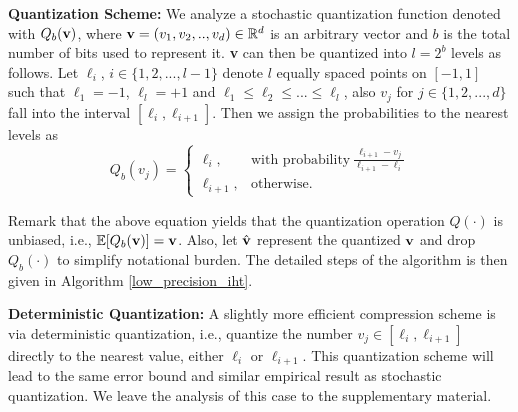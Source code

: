 \documentclass{article}
\begin{document}
{\bf Quantization Scheme:} We analyze a stochastic quantization function denoted with $Q_b({\bf v})$, where ${\bf v}=(v_1, v_2, .., v_d) \in \mathbb{R}^d$ is an arbitrary vector and $b$ is the total number of bits used to represent it. {\bf v} can then be quantized into $l=2^b$ levels as follows. Let $\ell_i$, $i\in \{1, 2, ..., l-1 \}$ denote $l$ equally spaced points on $[-1, 1]$ such that $\ell_1= -1$, $\ell_l= +1$ and $\ell_1\leq\ell_2 \leq ... \leq \ell_l$, also $v_j$ for $j\in \{1, 2, ..., d \}$ fall into the interval $[\ell_i, \ell_{i+1}]$. Then we assign the probabilities to the nearest levels as
\[
    Q_b(v_j) = \left\{\begin{array}{lr}
        \ell_i, & \textrm{with probability} \ \frac{\ell_{i+1}-v_j}{\ell_{i+1}-\ell_i}\\
        \ell_{i+1},&\textrm{otherwise}.  \ \ \ \  \ \ \ \ \ \ \ \ \ \ \ \ \ \ 
        \end{array}
\]
  
Remark that the above equation yields that the quantization operation $Q(\cdot)$ is unbiased, i.e., $\mathbb{E}[Q_b({\bf v})] = {\bf v}$. Also, let $\hat{{\bf v}}$ represent the quantized ${\bf v}$ and drop $Q_b(\cdot)$ to simplify notational burden. The detailed steps of the algorithm is then given in Algorithm \ref{low_precision_iht}.

{\bf Deterministic Quantization:} A slightly more efficient compression scheme is via deterministic quantization, i.e., quantize the number
$v_j \in [\ell_i, \ell_{i+1}]$ directly to the nearest
value, either $\ell_i$ or $\ell_{i+1}$. 
This quantization scheme will lead to the same 
error bound and similar empirical result as stochastic quantization. {We leave the analysis
of this case to the supplementary material.}
\end{document}
